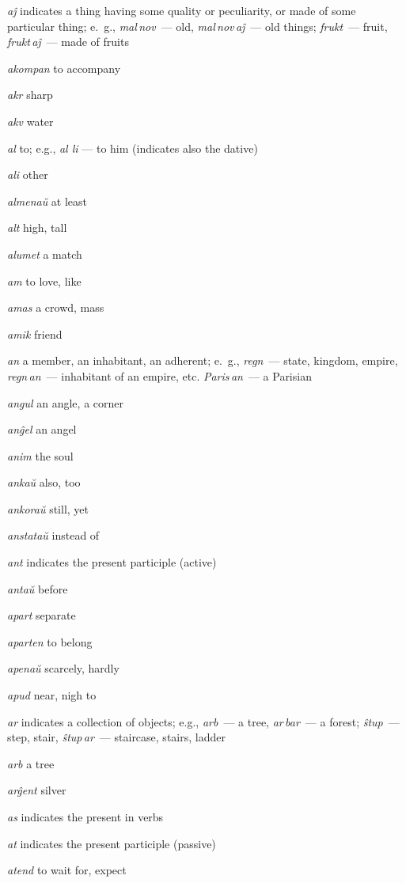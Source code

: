 \begin{landscape}
\begin{multicols}{5}
\begin{outdent}{1em}
\emph{aĵ} indicates a thing having some quality or peculiarity, or made of some particular thing; e.~g., \emph{mal\,nov\,} — old, \emph{mal\,nov\,aĵ\,} — old things; \emph{frukt\,} — fruit, \emph{frukt\,aĵ\,} — made of fruits

\emph{akompan} to accompany

\emph{akr} sharp

\emph{akv} water

\emph{al} to; e.g., \emph{al li} — to him (indicates also the dative)

\emph{ali} other

\emph{almenaŭ} at least

\emph{alt} high, tall

\emph{alumet} a match

\emph{am} to love, like

\emph{amas} a crowd, mass

\emph{amik} friend

\emph{an} a member, an inhabitant, an adherent; e.~g., \emph{regn\,} — state, kingdom, empire, \emph{regn\,an\,} — inhabitant of an empire, etc. \emph{Paris\,an\,} — a Parisian

\emph{angul} an angle, a corner

\emph{anĝel} an angel

\emph{anim} the soul

\emph{ankaŭ} also, too

\emph{ankoraŭ}  still, yet

\emph{anstataŭ} instead of

\emph{ant} indicates the present participle (active)

\emph{antaŭ} before

\emph{apart} separate

\emph{aparten  } to belong

\emph{apenaŭ  } scarcely, hardly

\emph{apud  } near, nigh to

\emph{ar  }indicates a collection of objects; e.g., \emph{arb\,} — a tree, \emph{ar\,bar\,} — a forest; \emph{ŝtup\,} — step, stair, \emph{ŝtup\,ar\,} — staircase, stairs, ladder

\emph{arb  } a tree

\emph{arĝent  } silver

\emph{as  } indicates the present in verbs

\emph{at  } indicates the present participle (passive)

\emph{atend  } to wait for, expect


\end{outdent}
\end{multicols}
\end{landscape}

